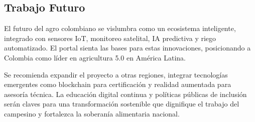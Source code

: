 \subsection{Trabajo Futuro}
El futuro del agro colombiano se vislumbra como un ecosistema inteligente, integrado con sensores IoT, monitoreo satelital, IA predictiva y riego automatizado. El portal sienta las bases para estas innovaciones, posicionando a Colombia como líder en agricultura 5.0 en América Latina.

Se recomienda expandir el proyecto a otras regiones, integrar tecnologías emergentes como blockchain para certificación y realidad aumentada para asesoría técnica. La educación digital continua y políticas públicas de inclusión serán claves para una transformación sostenible que dignifique el trabajo del campesino y fortalezca la soberanía alimentaria nacional.